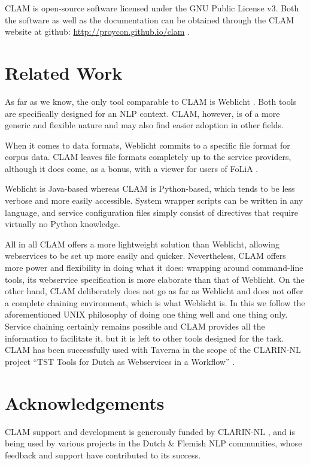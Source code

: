 \documentclass[11pt]{article}
\begin{document}
CLAM is open-source software licensed under the GNU Public License v3. Both the
software as well as the documentation can be obtained through the CLAM
website at github: \url{http://proycon.github.io/clam} .

\section{Related Work}

As far as we know, the only tool comparable to CLAM is Weblicht
\cite{WEBLICHT}. Both tools are specifically designed for an NLP context. CLAM,
however, is of a more generic and flexible nature and may also find easier
adoption in other fields.

When it comes to data formats, Weblicht commits to a specific file format for
corpus data. CLAM leaves file formats completely up to the service providers,
although it does come, as a bonus, with a viewer for users of FoLiA \cite{FOLIA}.

Weblicht is Java-based whereas CLAM is Python-based, which tends to be less
verbose and more easily accessible. System wrapper scripts can be written in
any language, and service configuration files simply consist of directives that
require virtually no Python knowledge.

All in all CLAM offers a more lightweight solution than Weblicht, allowing
webservices to be set up more easily and quicker. Nevertheless, CLAM offers
more power and flexibility in doing what it does: wrapping around command-line
tools, its webservice specification is more elaborate than that of Weblicht. On
the other hand, CLAM deliberately does not go as far as Weblicht and does not
offer a complete chaining environment, which is what Weblicht is. In this we
follow the aforementioned UNIX philosophy of doing one thing well and one thing
only. Service chaining certainly remains possible and CLAM provides all the
information to facilitate it, but it is left to other tools designed for the
task. CLAM has been successfully used with Taverna \cite{TAVERNA} in the scope
of the CLARIN-NL project ``TST Tools for Dutch as Webservices in a Workflow''
\cite{KEMPSSNIJDERS2012}. 

\section*{Acknowledgements}

CLAM support and development is generously funded by CLARIN-NL \cite{CLARIN}, and is being
used by various projects in the Dutch \& Flemish NLP communities, whose feedback
and support have contributed to its success. 



\end{document}
